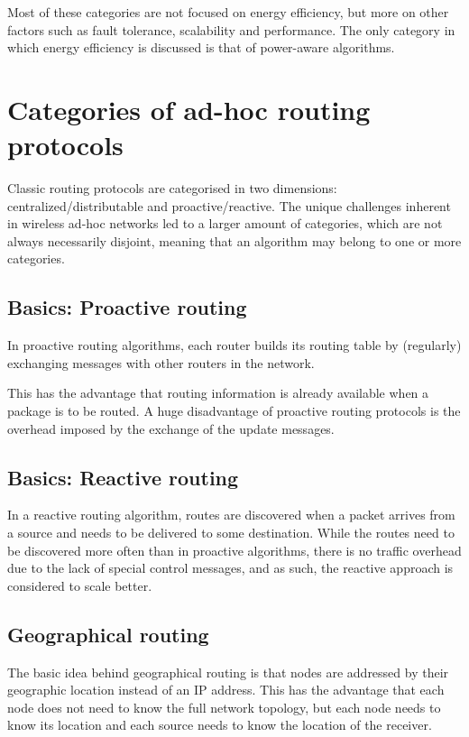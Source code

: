 \documentclass[conference]{IEEEtran}
\begin{document}
Most of these categories are not focused on energy efficiency, but more on
other factors such as fault tolerance, scalability and performance. The only
category in which energy efficiency is discussed is that of power-aware algorithms.


\section{Categories of ad-hoc routing protocols}
Classic routing protocols are categorised in two dimensions:
centralized/distributable and proactive/reactive.
The unique challenges inherent in wireless ad-hoc networks led to a larger
amount of categories, which are not always necessarily disjoint, meaning
that an algorithm may belong to one or more categories.

\subsection{Basics: Proactive routing}
In proactive routing algorithms, each router builds its routing table by
(regularly) exchanging messages with other routers in the network.

This has the advantage that routing information is already available when a
package is to be routed.
A huge disadvantage of proactive routing protocols is the overhead imposed
by the exchange of the update messages.

\subsection{Basics: Reactive routing}
In a reactive routing algorithm, routes are discovered when a packet arrives
from a source and needs to be delivered to some destination.
While the routes need to be discovered more often than in proactive algorithms,
there is no traffic overhead due to the lack of special control messages, and
as such, the reactive approach is considered to scale better.

\subsection{Geographical routing}
The basic idea behind geographical routing is that nodes are addressed by
their geographic location instead of an IP address. This has the advantage
that each node does not need to know the full network topology, but each
node needs to know its location and each source needs to know the location
of the receiver.
\end{document}
